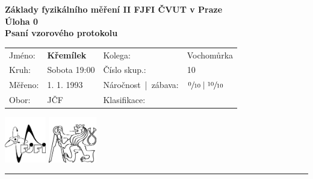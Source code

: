 \setlength{\parindent}{0cm}
\textsf{\textbf{Základy fyzikálního měření II \hfill FJFI ČVUT v Praze}\hspace*{1cm}}\\[0.1cm]
\textsf{\textbf{\large{Úloha 0 \\
			\raggedleft Psaní vzorového protokolu
}}}
\vspace{-0.6cm}
\setlength{\columnsep}{120pt}
\begin{multicols}{2}
	\noindent
	\linebreak
	\begin{tabular}{llll}
		\textsf{Jméno:} & \textsf{\textbf{Křemílek}} & \textsf{Kolega}: & \textsf{Vochomůrka} \\[0.05cm] 
		\textsf{Kruh:} & \textsf{Sobota 19:00} & \textsf{Číslo skup.:} & \textsf{10}  \\[0.05cm]
		\textsf{Měřeno:} & \textsf{1. 1. 1993}  & \textsf{Náročnost\ |\ zábava:} & $\sfrac{0}{10}\;|\;\sfrac{10}{10} $ \\[0.05cm]
		\textsf{Obor:} & \textsf{JČF} & \textsf{Klasifikace:} & 
	\end{tabular}
	\linebreak
	\columnbreak
	\hspace*{0.5cm}
	\includegraphics[height=2cm]{img/fjfi.pdf}
	\hspace{0.4cm}
	\includegraphics[height=2cm]{img/cvut.pdf}
	\hspace*{0.3cm}
\end{multicols}
\vspace*{-0.1cm}
\hrule
\setlength{\parindent}{0.5cm}